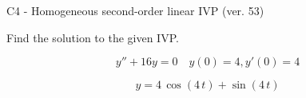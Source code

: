 \begin{exercise}
  \begin{exerciseTitle}C4 - Homogeneous second-order linear IVP (ver. 53)\end{exerciseTitle}
  \begin{exerciseStatement}
    
Find the solution to the given IVP.

    
\[y''+16y = 0 \hspace{1em} y(0) = 4 , y'(0) = 4\]

  \end{exerciseStatement}
  \begin{exerciseAnswer}
    
\[y= 4 \, \cos\left(4 \, t\right) + \sin\left(4 \, t\right)\]

  \end{exerciseAnswer}
\end{exercise}